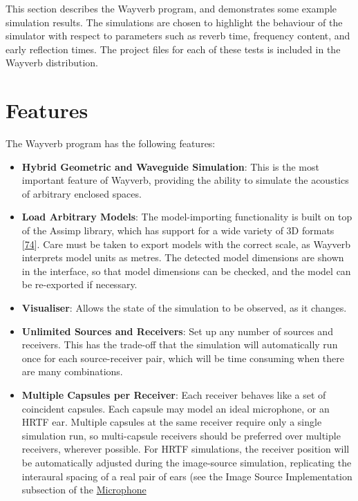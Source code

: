 \documentclass[]{scrreprt}
\providecommand{\tightlist}{%
  \setlength{\itemsep}{0pt}\setlength{\parskip}{0pt}}
\begin{document}
This section describes the Wayverb program, and demonstrates some
example simulation results. The simulations are chosen to highlight the
behaviour of the simulator with respect to parameters such as reverb
time, frequency content, and early reflection times. The project files
for each of these tests is included in the Wayverb distribution.

\section{Features}\label{features}

The Wayverb program has the following features:

\begin{itemize}
\tightlist
\item
  \textbf{Hybrid Geometric and Waveguide Simulation}: This is the most
  important feature of Wayverb, providing the ability to simulate the
  acoustics of arbitrary enclosed spaces.
\item
  \textbf{Load Arbitrary Models}: The model-importing functionality is
  built on top of the Assimp library, which has support for a wide
  variety of 3D formats
  {[}\protect\hyperlink{ref-ux5fassimpux5f2017}{74}{]}. Care must be
  taken to export models with the correct scale, as Wayverb interprets
  model units as metres. The detected model dimensions are shown in the
  interface, so that model dimensions can be checked, and the model can
  be re-exported if necessary.
\item
  \textbf{Visualiser}: Allows the state of the simulation to be
  observed, as it changes.
\item
  \textbf{Unlimited Sources and Receivers}: Set up any number of sources
  and receivers. This has the trade-off that the simulation will
  automatically run once for each source-receiver pair, which will be
  time consuming when there are many combinations.
\item
  \textbf{Multiple Capsules per Receiver}: Each receiver behaves like a
  set of coincident capsules. Each capsule may model an ideal
  microphone, or an HRTF ear. Multiple capsules at the same receiver
  require only a single simulation run, so multi-capsule receivers
  should be preferred over multiple receivers, wherever possible. For
  HRTF simulations, the receiver position will be automatically adjusted
  during the image-source simulation, replicating the interaural spacing
  of a real pair of ears (see the Image Source Implementation subsection
  of the
  \href{\%7B\%7B\%20site.baseurl\%20\%7D\%7D\%7B\%\%20link\%20microphone.md\%20\%\%7D}{Microphone
}
\end{itemize}
\end{document}
